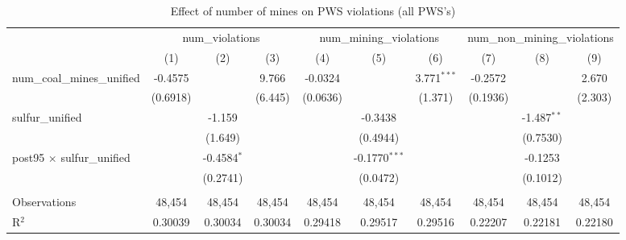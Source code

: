 
\begin{table}[htbp]
   \caption{\label{olsrf2sls_nummine_count_vio_1985to2005allhucs_coalunified} Effect of number of mines on PWS violations (all PWS's)}
   \bigskip
   \centering
   \begin{adjustbox}{width = \textwidth, center}
      \begin{tabular}{lccccccccc}
         \toprule
          & \multicolumn{3}{c}{num\_violations} & \multicolumn{3}{c}{num\_mining\_violations} & \multicolumn{3}{c}{num\_non\_mining\_violations}\\
                                                          & (1)           & (2)           & (3)           & (4)           & (5)             & (6)           & (7)           & (8)           & (9)\\  
         \midrule 
         num\_coal\_mines\_unified                        & -0.4575       &               & 9.766         & -0.0324       &                 & 3.771$^{***}$ & -0.2572       &               & 2.670\\   
                                                          & (0.6918)      &               & (6.445)       & (0.0636)      &                 & (1.371)       & (0.1936)      &               & (2.303)\\   
         sulfur\_unified                                  &               & -1.159        &               &               & -0.3438         &               &               & -1.487$^{**}$ &   \\   
                                                          &               & (1.649)       &               &               & (0.4944)        &               &               & (0.7530)      &   \\   
         post95 $\times$ sulfur\_unified                  &               & -0.4584$^{*}$ &               &               & -0.1770$^{***}$ &               &               & -0.1253       &   \\   
                                                          &               & (0.2741)      &               &               & (0.0472)        &               &               & (0.1012)      &   \\   
          \\
         Observations                                     & 48,454        & 48,454        & 48,454        & 48,454        & 48,454          & 48,454        & 48,454        & 48,454        & 48,454\\  
         R$^2$                                            & 0.30039       & 0.30034       & 0.30034       & 0.29418       & 0.29517         & 0.29516       & 0.22207       & 0.22181       & 0.22180\\  

\end{tabular}
\end{adjustbox}
\end{table}
